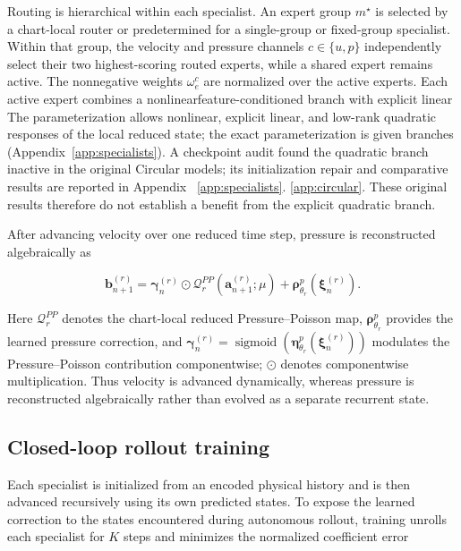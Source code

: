 \documentclass{article}
\providecommand{\DIFaddtex}[1]{{\protect\color{blue} \sf #1}} %
\providecommand{\DIFdeltex}[1]{{\protect\color{red} \scriptsize #1}} %
\providecommand{\DIFaddbegin}{} %
\providecommand{\DIFaddend}{} %
\providecommand{\DIFdelbegin}{} %
\providecommand{\DIFdelend}{} %
\providecommand{\DIFadd}[1]{\texorpdfstring{\DIFaddtex{#1}}{#1}} %
\providecommand{\DIFdel}[1]{\texorpdfstring{\DIFdeltex{#1}}{}} %
\begin{document}
Routing is hierarchical within each specialist. An expert group $m^\star$ is selected by a chart-local router or predetermined for a single-group or fixed-group specialist. Within that group, the velocity and pressure channels $c\in\{u,p\}$ independently select their two highest-scoring routed experts, while a shared expert remains active. The nonnegative weights $\omega_e^c$ are normalized over the active experts. \DIFdelbegin \DIFdel{Each active expert combines a nonlinearfeature-conditioned branch with explicit linear}\DIFdelend \DIFaddbegin \DIFadd{The parameterization allows nonlinear, explicit linear, }\DIFaddend and low-rank quadratic \DIFdelbegin \DIFdel{responses of the local reduced state; the exact parameterization is given }\DIFdelend \DIFaddbegin \DIFadd{branches (Appendix~\ref{app:specialists}). A checkpoint audit found the quadratic branch inactive in the original Circular models; its initialization repair and comparative results are reported }\DIFaddend in Appendix~\DIFdelbegin \DIFdel{\ref{app:specialists}. }\DIFdelend \DIFaddbegin \DIFadd{\ref{app:circular}. These original results therefore do not establish a benefit from the explicit quadratic branch.
}\DIFaddend 

After advancing velocity over one reduced time step, pressure is reconstructed algebraically as


\begin{equation}
  \bm b_{n+1}^{(r)}
  =\bm\gamma_n^{(r)}\odot\mathcal Q_r^{PP}(\bm a_{n+1}^{(r)};\mu)
  +\bm\rho^p_{\theta_r}(\bm\xi_n^{(r)}).
  \label{eq:main_pressure_closure}
\end{equation}


Here $\mathcal Q_r^{PP}$ denotes the chart-local reduced Pressure--Poisson map, $\bm\rho^p_{\theta_r}$ provides the learned pressure correction, and $\bm\gamma_n^{(r)} =\operatorname{sigmoid}(\bm\eta^p_{\theta_r}(\bm\xi_n^{(r)}))$ modulates the Pressure--Poisson contribution componentwise; $\odot$ denotes componentwise multiplication. Thus velocity is advanced dynamically, whereas pressure is reconstructed algebraically rather than evolved as a separate recurrent state.


\subsection{Closed-loop rollout training}

Each specialist is initialized from an encoded physical history and is then advanced recursively using its own predicted states. To expose the learned correction to the states encountered during autonomous rollout, training unrolls each specialist for $K$ steps and minimizes the
normalized coefficient error
\end{document}
